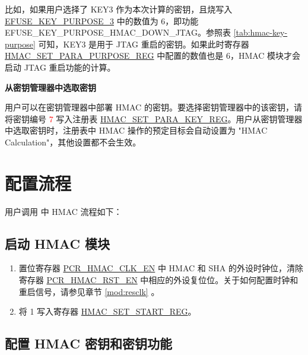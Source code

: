 \documentclass[main\_\_CN.tex]{subfiles}
\begin{document}
比如，如果用户选择了 KEY3 作为本次计算的密钥，且烧写入 \hyperref[fielddesc:EFUSEKEYPURPOSE3]{EFUSE\_KEY\_PURPOSE\_3} 中的数值为 6，即功能 EFUSE\_KEY\_PURPOSE\_HMAC\_DOWN\_JTAG。参照表 \ref{tab:hmac-key-purpose} 可知，KEY3 是用于 JTAG 重启的密钥。如果此时寄存器 \hyperref[regdesc:HMACSETPARAPURPOSEREG]{HMAC\_SET\_PARA\_PURPOSE\_REG} 中配置的数值也是 6，HMAC 模块才会启动 JTAG 重启功能的计算。

\textbf{从密钥管理器中选取密钥}
\label{sec:hmac-config-km-key}

用户可以在密钥管理器中部署 HMAC 的密钥。要选择密钥管理器中的该密钥，请将密钥编号 \textcolor{red}{7} 写入注册表 \hyperref[regdesc:HMACSETPARAKEYREG]{HMAC\_SET\_PARA\_KEY\_REG}。用户从密钥管理器中选取密钥时，注册表中 HMAC 操作的预定目标会自动设置为 "HMAC Calculation"，其他设置都不会生效。

\section{配置流程}
\label{sec:hmac-process-detailed}

用户调用 \chipname{} 中 HMAC 流程如下：

\subsection{启动 HMAC 模块}
\label{sec:hmac-enable-module}

    \begin{enumerate}
        \item 置位寄存器 \hyperref[fielddesc:PCRHMACCLKEN]{PCR\_HMAC\_CLK\_EN} 中 HMAC 和 SHA 的外设时钟位，清除寄存器 \hyperref[fielddesc:PCRHMACRSTEN]{PCR\_HMAC\_RST\_EN} 中相应的外设复位位。关于如何配置时钟和重启信号，请参见章节 \ref{mod:resclk} \textit{}。
        \item 将 1 写入寄存器 \hyperref[regdesc:HMACSETSTARTREG]{HMAC\_SET\_START\_REG}。
    \end{enumerate}

\subsection{配置 HMAC 密钥和密钥功能}
\end{document}

